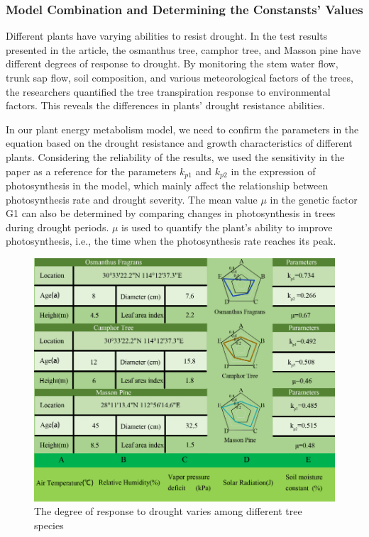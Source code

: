 \documentclass[12pt]{article}  %
\begin{document}
\subsubsection{Model Combination and Determining the Constansts' Values}

Different plants have varying abilities to resist drought. In the test results presented in the article{\cite{6}}, the osmanthus tree, camphor tree, and Masson pine have different degrees of response to drought. By monitoring the stem water flow, trunk sap flow, soil composition, and various meteorological factors of the trees, the researchers quantified the tree transpiration response to environmental factors. This reveals the differences in plants' drought resistance abilities.

In our plant energy metabolism model, we need to confirm the parameters in the equation based on the drought resistance and growth characteristics of different plants. Considering the reliability of the results, we used the sensitivity in the paper as a reference for the parameters $k_{p1}$ and $k_{p2}$ in the expression of photosynthesis in the model, which mainly affect the relationship between photosynthesis rate and drought severity. The mean value $\mu$ in the genetic factor G1 can also be determined by comparing changes in photosynthesis in trees during drought periods. $\mu$ is used to quantify the plant's ability to improve photosynthesis, i.e., the time when the photosynthesis rate reaches its peak.

\begin{figure}[htbp]
	\centering
	\includegraphics[width=1\textwidth]{easymcm/img/Tree species.pdf}
	\caption{The degree of response to drought varies among different tree species}
 \label{fig:degree}
\end{figure}
\end{document}
